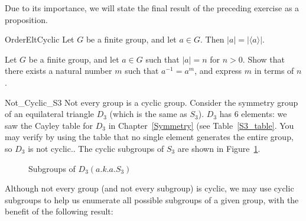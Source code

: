 Due to its importance, we will state the final result of the preceding exercise as a proposition.

\begin{prop}{OrderEltCyclic}
Let $G$ be a finite group, and let $a \in G$.  Then $|a|=| \langle a \rangle |$.
\end{prop}

\begin{exercise}{97}
Let $G$ be a finite group, and let $a \in G$ such that $|a| = n$ for $n>0$. Show that there exists a natural number $m$ such that $a^{-1} = a^m$, and express $m$ in terms of $n$.
\end{exercise}

 
\begin{example}{Not_Cyclic_S3}
Not every group is a cyclic group.  Consider the symmetry group of an
equilateral triangle $D_3$ (which is the same as $S_3$).  $D_3$ has 6 elements: we saw the Cayley table for $D_3$ in Chapter~\ref{Symmetry} (see Table~\ref{S3_table}.  You may verify by using the table that no single element generates the entire group, so $D_3$ is not cyclic..
The cyclic subgroups of $S_3$ are shown in
Figure~\ref{subgrpsS3}. 
\hspace*{1in}
\end{example}

\begin{figure}[htb] %
\begin{center}
\end{center}
\caption{Subgroups of $D_3 (a.k.a. S_3)$}
\label{subgrpsS3}
\end{figure}

Although not every group  (and not every subgroup) is cyclic, we may use cyclic subgroups to help us
enumerate all possible subgroups of a given group, with the benefit of the following result:

